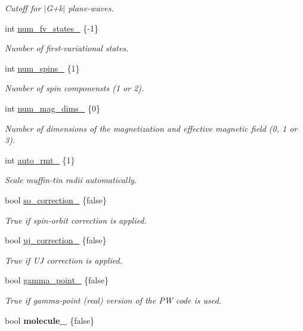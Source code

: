 \begin{DoxyCompactItemize}
\begin{DoxyCompactList}\small\item\em Cutoff for $\vert$\+G+k$\vert$ plane-\/waves. \end{DoxyCompactList}\item 
int \hyperlink{classsirius_1_1_simulation__parameters_ae0ad7dd838b9147f2702229b3a15400b}{num\+\_\+fv\+\_\+states\+\_\+} \{-\/1\}
\begin{DoxyCompactList}\small\item\em Number of first-\/variational states. \end{DoxyCompactList}\item 
int \hyperlink{classsirius_1_1_simulation__parameters_a2942cc87ed44e4e2e36a3daee27791a9}{num\+\_\+spins\+\_\+} \{1\}
\begin{DoxyCompactList}\small\item\em Number of spin componensts (1 or 2). \end{DoxyCompactList}\item 
int \hyperlink{classsirius_1_1_simulation__parameters_a8ee49df1c0e77bdfa71ff9abaaef761b}{num\+\_\+mag\+\_\+dims\+\_\+} \{0\}
\begin{DoxyCompactList}\small\item\em Number of dimensions of the magnetization and effective magnetic field (0, 1 or 3). \end{DoxyCompactList}\item 
int \hyperlink{classsirius_1_1_simulation__parameters_a745081d2fe55d458abe99fe476a0f117}{auto\+\_\+rmt\+\_\+} \{1\}
\begin{DoxyCompactList}\small\item\em Scale muffin-\/tin radii automatically. \end{DoxyCompactList}\item 
bool \hyperlink{classsirius_1_1_simulation__parameters_a0ec6fb89078a406364190b00ebf0455a}{so\+\_\+correction\+\_\+} \{false\}
\begin{DoxyCompactList}\small\item\em True if spin-\/orbit correction is applied. \end{DoxyCompactList}\item 
bool \hyperlink{classsirius_1_1_simulation__parameters_aad724bf05da461b881182259af50f791}{uj\+\_\+correction\+\_\+} \{false\}
\begin{DoxyCompactList}\small\item\em True if U\+J correction is applied. \end{DoxyCompactList}\item 
bool \hyperlink{classsirius_1_1_simulation__parameters_aa834be8352acc1f928fabefa1006051f}{gamma\+\_\+point\+\_\+} \{false\}
\begin{DoxyCompactList}\small\item\em True if gamma-\/point (real) version of the P\+W code is used. \end{DoxyCompactList}\item 
\hypertarget{classsirius_1_1_simulation__parameters_ac59e073a19c4ddd174563931ec026d45}{}bool {\bfseries molecule\+\_\+} \{false\}\label{classsirius_1_1_simulation__parameters_ac59e073a19c4ddd174563931ec026d45}


\end{DoxyCompactItemize}
